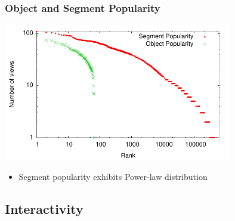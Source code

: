 \documentclass[xcolor=pdftex,dvipsnames,table]{beamer}
\begin{document}
\begin{frame}
    \frametitle{Object and Segment Popularity}

    \includegraphics[width=10cm]{../NOSSDAV07/diagrams/all_sessions_rank}

    {\footnotesize
    \begin{itemize}
        \item {Segment popularity exhibits Power-law distribution}
    \end{itemize}
    }

\end{frame}

\subsection{Interactivity}
\end{document}
